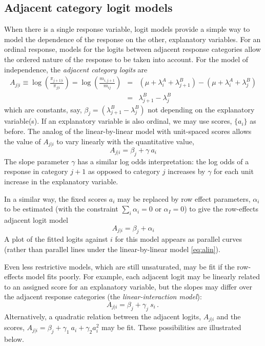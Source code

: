 \subsection{Adjacent category logit models}\label{sec:loglin-ordadj}
When there is a single response variable, logit models provide a
simple way to model the dependence of the response on the other,
explanatory variables.  For an ordinal response,
models for the logits between adjacent response categories
allow the ordered nature of the response to be taken into account.
For the model of independence, the \emph{adjacent category logits} are
\begin{eqnarray}
A_{j| i} \equiv
\log \left(
 \frac{ \pi_{j+1|i} } { \pi_{j|i} }
 \right) =
\log \left(
 \frac{ m_{i, j+1} } { m_{ij} }
 \right)
  & = &
( \mu  +  \lambda_i^A +  \lambda_{j+1}^B ) -
( \mu  +  \lambda_i^A +  \lambda_j^B )  \nonumber \\
  & = &  \lambda_{j+1}^B -  \lambda_{j}^B \label{eq:aindep}
\end{eqnarray}
which are constants, say, $\beta_j = (\lambda_{j+1}^B -  \lambda_{j}^B )$
not depending on the explanatory variable(s).
If an explanatory variable is also ordinal, we may use scores, $\{a_i\}$
as before.
The analog of the linear-by-linear model with unit-spaced scores
allows the value of $A_{j| i}$ to vary linearly with the quantitative value,
\begin{equation}\label{eq:alin}
A_{j| i} = \beta_j + \gamma \: a_i
\end{equation}
The slope parameter $\gamma$ has a similar log odds interpretation:
the log odds of a response in category $j+1$
as opposed to category $j$ increases by $\gamma$
for each unit increase in the explanatory variable.

In a similar way, the fixed scores $a_i$ may be replaced by row effect
parameters, $\alpha_i$ to be estimated (with the constraint $\sum_i \alpha_i =0$ or $\alpha_I =0$)
to give the row-effects adjacent logit model
\begin{equation}\label{eq:arow}
A_{j| i} = \beta_j + \alpha_i
\end{equation}
A plot of the fitted logits against $i$ for this model appears as parallel
curves (rather than parallel lines under the linear-by-linear model
\eqref{eq:alin}).

Even less restrictive models, which are still unsaturated, may be fit if the row-effects model fits poorly.  For example, each adjacent logit may be
linearly related to an assigned score for an explanatory variable,
but the slopes may differ over the adjacent response categories
(the \emph{linear-interaction model}):
\begin{equation}\label{eq:alin-int}
A_{j| i} = \beta_j + \gamma_j \: s_i \period
\end{equation}
Alternatively, a quadratic relation between the
adjacent logits, $A_{j| i}$ and the scores,
$A_{j| i} = \beta_j + \gamma_1 \: a_i + \gamma_2 a_i^2$
may be fit.
These possibilities are illustrated below.

